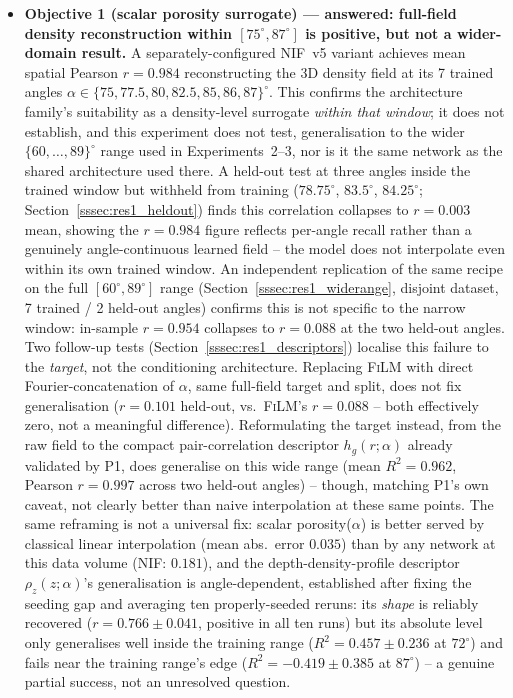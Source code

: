 \documentclass[aip,amsmath,amssymb,reprint]{revtex4-1}
\renewcommand{\ang}{\ensuremath{\alpha}} %
\newcommand{\nif}{\textsc{NIF}}
\newcommand{\film}{\textsc{FiLM}}
\begin{document}
\begin{itemize}
  \item \textbf{Objective 1 (scalar porosity surrogate) — answered:
    full-field density reconstruction within $[75^{\circ},87^{\circ}]$ is
    positive, but not a wider-domain result.}
    A separately-configured \nif{}~v5 variant achieves mean spatial
    Pearson $r = 0.984$ reconstructing the 3D density field at its
    7 trained angles $\ang \in \{75, 77.5, 80, 82.5, 85, 86, 87\}^{\circ}$.
    This confirms the architecture family's suitability as a
    density-level surrogate \emph{within that window}; it does not
    establish, and this experiment does not test, generalisation to
    the wider $\{60,\ldots,89\}^{\circ}$ range used in Experiments~2--3,
    nor is it the same network as the shared architecture used
    there. A held-out test at three angles inside the trained window
    but withheld from training ($78.75^{\circ}$, $83.5^{\circ}$,
    $84.25^{\circ}$; Section~\ref{sssec:res1_heldout}) finds this
    correlation collapses to $r = 0.003$ mean, showing the $r=0.984$
    figure reflects per-angle recall rather than a genuinely
    angle-continuous learned field -- the model does not interpolate
    even within its own trained window. An independent replication
    of the same recipe on the full $[60^{\circ},89^{\circ}]$ range
    (Section~\ref{sssec:res1_widerange}, disjoint dataset, 7 trained /
    2 held-out angles) confirms this is not specific to the narrow
    window: in-sample $r = 0.954$ collapses to $r = 0.088$ at the two
    held-out angles.
    Two follow-up tests (Section~\ref{sssec:res1_descriptors}) localise
    this failure to the \emph{target}, not the conditioning
    architecture. Replacing \film{} with direct Fourier-concatenation
    of $\ang$, same full-field target and split, does not fix
    generalisation ($r=0.101$ held-out, vs.\ \film{}'s $r=0.088$ --
    both effectively zero, not a meaningful difference). Reformulating
    the target instead, from the raw field to the compact
    pair-correlation descriptor $h_g(r;\ang)$ already validated by P1,
    does generalise on this wide range (mean $R^2=0.962$, Pearson
    $r=0.997$ across two held-out angles) -- though, matching P1's own
    caveat, not clearly better than naive interpolation at these same
    points. The same reframing is not a universal fix: scalar
    porosity($\ang$) is better served by classical linear interpolation
    (mean abs.\ error $0.035$) than by any network at this data volume
    (NIF: $0.181$), and the depth-density-profile descriptor
    $\rho_z(z;\ang)$'s generalisation is angle-dependent, established
    after fixing the seeding gap and averaging ten properly-seeded
    reruns: its \emph{shape} is reliably recovered ($r=0.766\pm0.041$,
    positive in all ten runs) but its absolute level only generalises
    well inside the training range ($R^2=0.457\pm0.236$ at
    $72^{\circ}$) and fails near the training range's edge
    ($R^2=-0.419\pm0.385$ at $87^{\circ}$) -- a genuine partial
    success, not an unresolved question.


\end{itemize}
\end{document}
